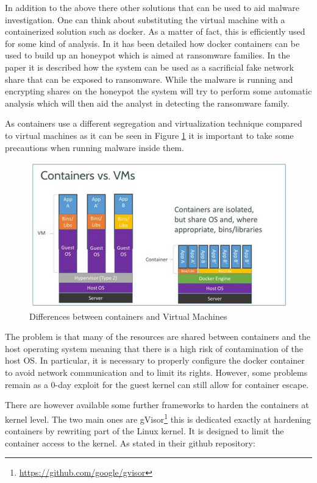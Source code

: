 In addition to the above there other solutions that can be used to aid malware investigation. One can think about substituting the virtual machine with a containerized solution such as docker. As a matter of fact, this is efficiently used for some kind of analysis. In \cite{9042158} it has been detailed how docker containers can be used to build up an honeypot which is aimed at ransomware families. In the paper it is described how the system can be used as a sacrificial fake network share that can be exposed to ransomware. While the malware is running and encrypting shares on the honeypot the system will try to perform some automatic analysis which will then aid the analyst in detecting the ransomware family.

As containers use a different segregation and virtualization technique compared to virtual machines as it can be seen in Figure \ref{fig:dockvm} it is important to take some precautions when running malware inside them. 

\begin{figure}[htp]
\centering
\includegraphics[width=\linewidth]{images/dockervm.png}
\caption{Differences between containers and Virtual Machines}
\label{fig:dockvm}
\end{figure}

The problem is that many of the resources are shared between containers and the host operating system meaning that there is a high risk of contamination of the host OS. In particular, it is necessary to properly configure the docker container to avoid network communication and to limit its rights. However, some problems remain as a 0-day exploit for the guest kernel can still allow for container escape. 

There are however available some further frameworks to harden the containers at kernel level. The two main ones are gVisor\footnote{\url{https://github.com/google/gvisor}} this is dedicated exactly at hardening containers by rewriting part of the Linux kernel. It is designed to limit the container access to the kernel. As stated in their github repository:

